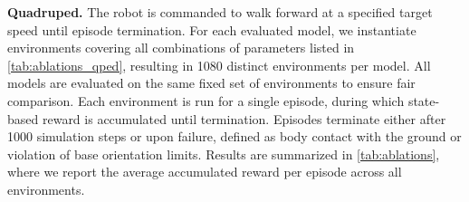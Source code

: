 \textbf{Quadruped.}
The robot is commanded to walk forward at a specified target speed until episode termination. For each evaluated model, we instantiate environments covering all combinations of parameters listed in \cref{tab:ablations_qped}, resulting in 1080 distinct environments per model. All models are evaluated on the same fixed set of environments to ensure fair comparison. Each environment is run for a single episode, during which state-based reward is accumulated until termination. Episodes terminate either after 1000 simulation steps or upon failure, defined as body contact with the ground or violation of base orientation limits. Results are summarized in \cref{tab:ablations}, where we report the average accumulated reward per episode across all environments.

